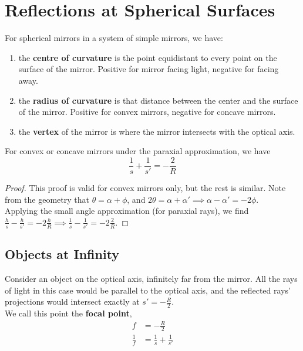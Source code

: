 \section{Reflections at Spherical Surfaces}


\begin{definition}
    For spherical mirrors in a system of simple mirrors, we have:
    \begin{enumerate}
        \item the \textbf{centre of curvature} is the point equidistant to every point on the surface of the mirror. Positive for mirror facing light, negative for facing away.
        \item the \textbf{radius of curvature} is that distance between the center and the surface of the mirror. Positive for convex mirrors, negative for concave mirrors.
        \item the \textbf{vertex} of the mirror is where the mirror intersects with the optical axis.
    \end{enumerate}
\end{definition}


\begin{theorem}
    For convex or concave mirrors under the paraxial approximation, we have $$\frac{1}{s} + \frac{1}{s'} = -\frac{2}{R}$$
\end{theorem}
\begin{proof}
    This proof is valid for convex mirrors only, but the rest is similar.
    Note from the geometry that $\theta = \alpha + \phi$, and $2\theta = \alpha + \alpha' \implies \alpha - \alpha' = -2\phi$. \\
    Applying the small angle approximation (for paraxial rays), we find $\frac{h}{s} - \frac{h}{s'} = -2\frac{h}{R} \implies \frac{1}{s} - \frac{1}{s'} = -2\frac{2}{R}$.
\end{proof}

\subsection{Objects at Infinity}

\begin{definition}
    Consider an object on the optical axis, infinitely far from the mirror. All the rays of light in this case would be parallel to the optical axis, and the reflected rays' projections would intersect exactly at $s' = -\frac{R}{2}$. \\
    We call this point the \textbf{focal point},
    \begin{align*}
        f &= -\frac{R}{2} \\
        \frac{1}{f} &= \frac{1}{s} + \frac{1}{s'} \\
    \end{align*}
\end{definition}

